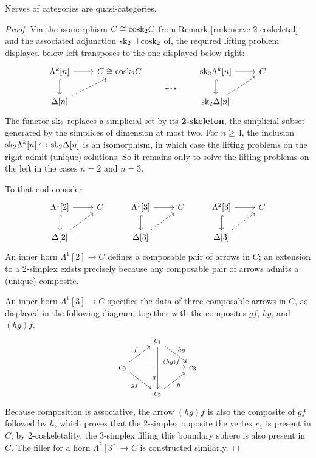  \begin{prop}\label{prop:nerve-qcat} Nerves of categories are quasi-categories.
 \end{prop}
 \begin{proof}
 Via the isomorphism $C \cong \textup{cosk}_2C$ from Remark \ref{rmk:nerve-2-coskeletal} and the associated adjunction $\textup{sk}_2 \dashv \textup{cosk}_2$ of,   %
  the required lifting problem displayed below-left transposes to the one displayed below-right:
 \[
 \begin{tikzcd}
 \Lambda^k[n] \arrow[d, hook] \arrow[r] & C \cong \cosk_2C & \arrow[d, phantom, "\leftrightsquigarrow"] & \sk_2\Lambda^k[n] \arrow[r] \arrow[d, hook] & C \\ \Delta[n] \arrow[ur, dashed] & & ~ & \sk_2\Delta[n] \arrow[ur, dashed]
 \end{tikzcd}
 \]
 The functor $\textup{sk}_2$ replaces a simplicial set by its \textbf{2-skeleton}, the simplicial subset generated by the simplices of dimension at most two. For $n \geq 4$, the inclusion $\textup{sk}_2\Lambda^k[n]\hookrightarrow\textup{sk}_2\Delta[n]$ is an isomorphism, in which case the lifting problems on the right admit (unique) solutions. So it remains only to solve the lifting problems on the left in the cases $n=2$ and $n=3$.

 To that end consider
 \[
 \begin{tikzcd}
 \Lambda^1[2] \arrow[r] \arrow[d, hook] & C & \Lambda^1[3] \arrow[d, hook] \arrow[r]  & C & \Lambda^2[3] \arrow[r] \arrow[d, hook] & C \\ \Delta[2] \arrow[ur, dashed] & & \Delta[3] \arrow[ur, dashed] & & \Delta[3] \arrow[ur, dashed]
 \end{tikzcd}
 \]
 An inner horn $\Lambda^1[2] \to C$ defines a composable pair of arrows in $C$; an extension to a 2-simplex exists precisely because any composable pair of arrows admits a (unique) composite.

 An inner horn $\Lambda^1[3] \to C$ specifies the data of three composable arrows in $C$, as displayed in the following diagram, together with the composites $gf$, $hg$, and $(hg)f$.
 \[
 \begin{tikzcd}
 & c_1\arrow[dr, "hg"] \\ c_0 \arrow[ur, "f"] \arrow[dr, "gf"'] \arrow[rr, "(hg)f" near end] & & c_3 \\ & c_2 \arrow[ur, "h"']  \arrow[from=uu, crossing over, "g"' near end]
 \end{tikzcd}
 \]
 Because composition is associative, the arrow $(hg)f$ is also the composite of $gf$ followed by $h$, which proves that the 2-simplex opposite the vertex $c_1$ is present in $C$; by 2-coskeletality, the 3-simplex filling this boundary sphere is also present in $C$. The filler for a horn $\Lambda^2[3] \to C$ is constructed similarly.
 \end{proof}

